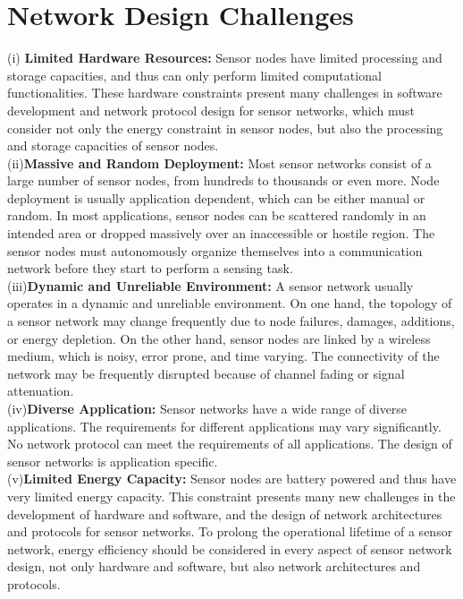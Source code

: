 \section{Network Design Challenges}
\begin{justify}
(i)	\textbf{Limited Hardware Resources:} Sensor nodes have limited processing and storage capacities, and thus can only perform limited computational functionalities. These hardware constraints present many challenges in software development and network protocol design for sensor networks, which must consider not only the energy constraint in sensor nodes, but also the processing and storage capacities of sensor nodes.\\
(ii)\textbf{Massive and Random Deployment:} Most sensor networks consist of a large number of sensor nodes, from hundreds to thousands or even more. Node deployment is usually application dependent, which can be either manual or random. In most applications, sensor nodes can be scattered randomly in an intended area or dropped massively over an inaccessible or hostile region. The sensor nodes must autonomously organize themselves into a communication network before they start to perform a sensing task.\\
(iii)\textbf{Dynamic and Unreliable Environment:} A sensor network usually operates in a dynamic and unreliable environment. On one hand, the topology of a sensor network may change frequently due to node failures, damages, additions, or energy depletion. On the other hand, sensor nodes are linked by a wireless medium, which is noisy, error prone, and time varying. The connectivity of the network may be frequently disrupted because of channel fading or signal attenuation.\\
(iv)\textbf{Diverse Application:} Sensor networks have a wide range of diverse applications. The requirements for different applications may vary significantly. No network protocol can meet the requirements of all applications. The design of sensor networks is application specific.\\
(v)\textbf{Limited Energy Capacity:} Sensor nodes are battery powered and thus have very limited energy capacity. This constraint presents many new challenges in the development of hardware and software, and the design of network architectures and protocols for sensor networks. To prolong the operational lifetime of a sensor network, energy efficiency should be considered in every aspect of sensor network design, not only hardware and software, but also network architectures and protocols.\\
\end{justify}

